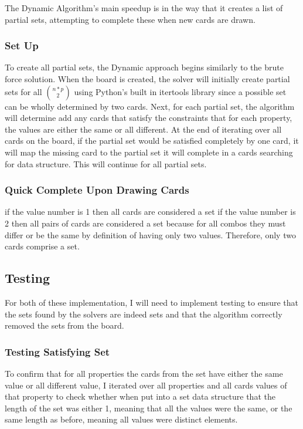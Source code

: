 \documentclass[pageno]{jpaper}
\begin{document}
The Dynamic Algorithm's main speedup is in the way that it creates a list of partial sets, attempting to complete these when new cards are drawn. 

\subsubsection{Set Up}

To create all partial sets, the Dynamic approach begins similarly to the brute force solution. When the board is created, the solver will initially create partial sets for all ${n*p}\choose{2}$ using Python's built in itertools library since a possible set can be wholly determined by two cards. Next, for each partial set, the algorithm will determine add any cards that satisfy the constraints that for each property, the values are either the same or all different. At the end of iterating over all cards on the board, if the partial set would be satisfied completely by one card, it will map the missing card to the partial set it will complete in a cards searching for data structure. This will continue for all partial sets. 


\subsubsection{Quick Complete Upon Drawing Cards}



if the value number is 1 then all cards are considered a set
if the value number is 2 then all pairs of cards are considered a set because for all combos they must differ or be the same by definition of having only two values. Therefore, only two cards comprise a set. 



\subsection{Testing}

For both of these implementation, I will need to implement testing to ensure that the sets found by the solvers are indeed sets and that the algorithm correctly removed the sets from the board. 

\subsubsection{Testing Satisfying Set}

To confirm that for all properties the cards from the set have either the same value or all different value, I iterated over all properties and all cards values of that property to check whether when put into a set data structure that the length of the set was either 1, meaning that all the values were the same, or the same length as before, meaning all values were distinct elements. 
\end{document}
